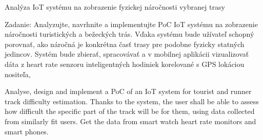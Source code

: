 
Analýza IoT systému na zobrazenie fyzickej náročnosti vybranej trasy

Zadanie: Analyzujte, navrhnite a implementujte PoC IoT systému na zobrazenie náročnosti turistických a bežeckých trás. Vďaka systému bude užívateľ schopný porovnať, ako náročná je konkrétna časť trasy pre podobne fyzicky statných jedincov. Systém bude zbierať, spracovávať a v mobilnej aplikácii vizualizovať dáta z heart rate senzoru inteligentných hodiniek korelované s GPS lokáciou nositeľa, 


Analyse, design and implement a PoC of an IoT system for tourist and runner track difficulty estimation. Thanks to the system, the user shall be able to assess how difficult the specific part of the track will be for them, using data collected from similarly fit users. Get the data from smart watch heart rate monitors and smart phones. 
